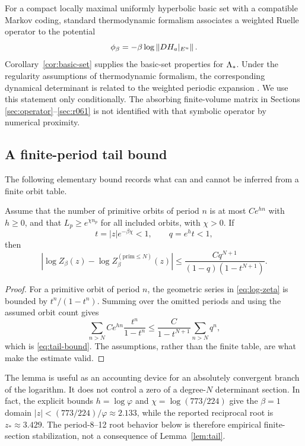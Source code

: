 For a compact locally maximal uniformly hyperbolic basic set with a compatible
Markov coding, standard thermodynamic formalism associates a weighted Ruelle
operator to the potential
\begin{equation}
 \phi_\beta=-\beta\log \left\lVert DH_a|_{E^u}\right\rVert.
 \label{eq:potential}
\end{equation}
Corollary~\ref{cor:basic-set} supplies the basic-set properties for $\Lambda_*$.  Under
the regularity assumptions of thermodynamic formalism, the corresponding
dynamical determinant is related to the weighted periodic expansion
\citep{Ruelle1976Zeta,Ruelle1978Thermodynamic,Bowen1975Equilibrium,
Baladi2000,BlankKellerLiverani2002,BaladiTsujii2016}.  We use this statement
only conditionally.  The absorbing finite-volume matrix in Sections
\ref{sec:operator}--\ref{sec:r061} is not identified with that symbolic
operator by numerical proximity.

\subsection{A finite-period tail bound}

The following elementary bound records what can and cannot be inferred from a
finite orbit table.

\begin{lemma}
\label{lem:tail}
Assume that the number of primitive orbits of period $n$ is at most
$C e^{hn}$ with $h\geq0$, and that $L_p\geq e^{\chi n_p}$ for all included
orbits, with $\chi>0$.  If
\[
 t=|z|e^{-\beta\chi}<1,\qquad q=e^h t<1,
\]
then
\begin{equation}
 \left|\log Z_\beta(z)-
 \log Z_\beta^{(\mathrm{prim}\leq N)}(z)\right|
 \leq
 \frac{Cq^{N+1}}{(1-q)(1-t^{N+1})}.
 \label{eq:tail-bound}
\end{equation}
\end{lemma}

\begin{proof}
For a primitive orbit of period $n$, the geometric series in
\eqref{eq:log-zeta} is bounded by $t^n/(1-t^n)$.  Summing over the omitted
periods and using the assumed orbit count gives
\[
 \sum_{n>N} C e^{hn}\frac{t^n}{1-t^n}
 \leq \frac{C}{1-t^{N+1}}
 \sum_{n>N}q^n,
\]
which is \eqref{eq:tail-bound}.  The assumptions, rather than the finite table,
are what make the estimate valid.
\end{proof}

The lemma is useful as an accounting device for an absolutely convergent branch
of the logarithm.  It does not control a zero of a degree-$N$ determinant
section.  In fact, the explicit bounds $h=\log\varphi$ and
$\chi=\log(773/224)$ give the $\beta=1$ domain
$|z|<(773/224)/\varphi\approx2.133$, while the reported reciprocal root is
$z_*\approx3.429$.  The period-8--12 root behavior below is therefore empirical
finite-section stabilization, not a consequence of Lemma~\ref{lem:tail}.

